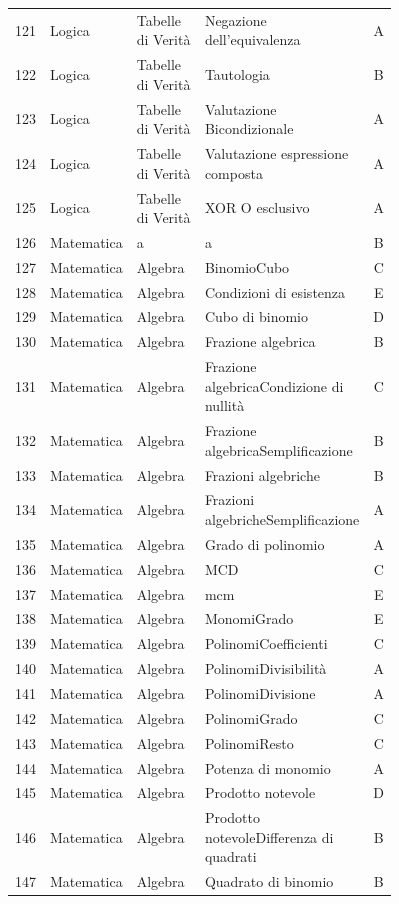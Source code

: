 \documentclass[20pt, a4paper]{article}
\begin{document}
\begin{longtable}{@{}r>{\raggedright\arraybackslash}p{0.14\linewidth}>{\raggedright\arraybackslash}p{0.20\linewidth}>{\raggedright\arraybackslash}p{0.42\linewidth}c@{}}
121 & Logica & Tabelle di Verità & Negazione dell'equivalenza & A \\
122 & Logica & Tabelle di Verità & Tautologia & B \\
123 & Logica & Tabelle di Verità & Valutazione Bicondizionale & A \\
124 & Logica & Tabelle di Verità & Valutazione espressione composta & A \\
125 & Logica & Tabelle di Verità & XOR O esclusivo & A \\
126 & Matematica & a & a & B \\
127 & Matematica & Algebra & BinomioCubo & C \\
128 & Matematica & Algebra & Condizioni di esistenza & E \\
129 & Matematica & Algebra & Cubo di binomio & D \\
130 & Matematica & Algebra & Frazione algebrica & B \\
131 & Matematica & Algebra & Frazione algebricaCondizione di nullità & C \\
132 & Matematica & Algebra & Frazione algebricaSemplificazione & B \\
133 & Matematica & Algebra & Frazioni algebriche & B \\
134 & Matematica & Algebra & Frazioni algebricheSemplificazione & A \\
135 & Matematica & Algebra & Grado di polinomio & A \\
136 & Matematica & Algebra & MCD & C \\
137 & Matematica & Algebra & mcm & E \\
138 & Matematica & Algebra & MonomiGrado & E \\
139 & Matematica & Algebra & PolinomiCoefficienti & C \\
140 & Matematica & Algebra & PolinomiDivisibilità & A \\
141 & Matematica & Algebra & PolinomiDivisione & A \\
142 & Matematica & Algebra & PolinomiGrado & C \\
143 & Matematica & Algebra & PolinomiResto & C \\
144 & Matematica & Algebra & Potenza di monomio & A \\
145 & Matematica & Algebra & Prodotto notevole & D \\
146 & Matematica & Algebra & Prodotto notevoleDifferenza di quadrati & B \\
147 & Matematica & Algebra & Quadrato di binomio & B \\

\end{longtable}
\end{document}
